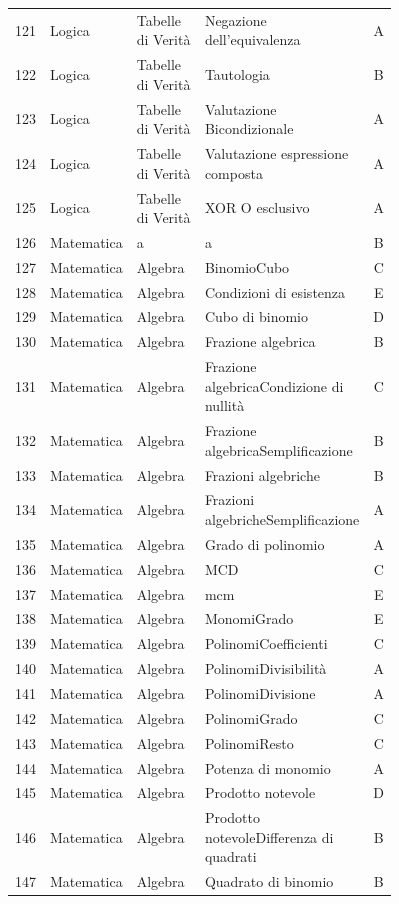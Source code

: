 \documentclass[20pt, a4paper]{article}
\begin{document}
\begin{longtable}{@{}r>{\raggedright\arraybackslash}p{0.14\linewidth}>{\raggedright\arraybackslash}p{0.20\linewidth}>{\raggedright\arraybackslash}p{0.42\linewidth}c@{}}
121 & Logica & Tabelle di Verità & Negazione dell'equivalenza & A \\
122 & Logica & Tabelle di Verità & Tautologia & B \\
123 & Logica & Tabelle di Verità & Valutazione Bicondizionale & A \\
124 & Logica & Tabelle di Verità & Valutazione espressione composta & A \\
125 & Logica & Tabelle di Verità & XOR O esclusivo & A \\
126 & Matematica & a & a & B \\
127 & Matematica & Algebra & BinomioCubo & C \\
128 & Matematica & Algebra & Condizioni di esistenza & E \\
129 & Matematica & Algebra & Cubo di binomio & D \\
130 & Matematica & Algebra & Frazione algebrica & B \\
131 & Matematica & Algebra & Frazione algebricaCondizione di nullità & C \\
132 & Matematica & Algebra & Frazione algebricaSemplificazione & B \\
133 & Matematica & Algebra & Frazioni algebriche & B \\
134 & Matematica & Algebra & Frazioni algebricheSemplificazione & A \\
135 & Matematica & Algebra & Grado di polinomio & A \\
136 & Matematica & Algebra & MCD & C \\
137 & Matematica & Algebra & mcm & E \\
138 & Matematica & Algebra & MonomiGrado & E \\
139 & Matematica & Algebra & PolinomiCoefficienti & C \\
140 & Matematica & Algebra & PolinomiDivisibilità & A \\
141 & Matematica & Algebra & PolinomiDivisione & A \\
142 & Matematica & Algebra & PolinomiGrado & C \\
143 & Matematica & Algebra & PolinomiResto & C \\
144 & Matematica & Algebra & Potenza di monomio & A \\
145 & Matematica & Algebra & Prodotto notevole & D \\
146 & Matematica & Algebra & Prodotto notevoleDifferenza di quadrati & B \\
147 & Matematica & Algebra & Quadrato di binomio & B \\

\end{longtable}
\end{document}
